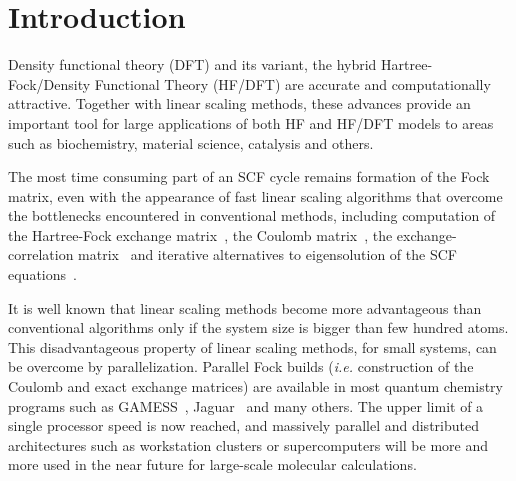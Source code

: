 \documentclass[prl,preprint,doublespace]{revtex4} %
\begin{document}
\section{Introduction}

 Density functional theory (DFT) and its variant, 
 the hybrid Hartree-Fock/Density Functional Theory (HF/DFT) are accurate and
 computationally attractive. Together with linear scaling methods, these
 advances provide an important tool for large applications
 of both HF and HF/DFT models to areas such as biochemistry, 
 material science, catalysis and others.


 The most time consuming part of an SCF cycle remains formation
 of the Fock matrix, even with the appearance of fast linear
 scaling algorithms 
 that overcome the bottlenecks encountered in conventional methods,
 including computation of the Hartree-Fock exchange 
 matrix~\cite{ESchwegler96,ESchwegler97,ESchwegler98A,ESchwegler99,ESchwegler00,CTymczak04b},
 the Coulomb 
 matrix~\cite{CWhite94B,CWhite96A,MChallacombe96,MChallacombe96B,MStrain96,
              JPerezjorda97,MChallacombe97,CTymczak04a}, 
 the exchange-correlation 
 matrix~\cite{CTymczak04a,Jorda95,RStratmann96,CGuerra98,MChallacombe00A}
 and iterative alternatives to eigensolution of the SCF 
 equations~\cite{XLi93,MDaw93,ADaniels97,APalser98,
                 MChallacombe99,ANiklasson02A,ANiklasson03}.

 It is well known that linear scaling 
 methods become more advantageous than conventional  
 algorithms only if the system size is bigger than
 few hundred atoms. This disadvantageous property of linear
 scaling methods, for small systems, can be overcome by 
 parallelization. 
 Parallel Fock builds ({\em i.e.} construction of the Coulomb and exact exchange matrices)
 are available in most quantum
 chemistry programs such as GAMESS~\cite{GAMESS},
 Jaguar~\cite{DChasman98} and many others. 
 The upper limit of a single processor speed
 is now reached, and massively parallel and distributed
 architectures such as workstation clusters or supercomputers will be 
 more and more used in the near future for large-scale 
 molecular calculations.
\end{document}
